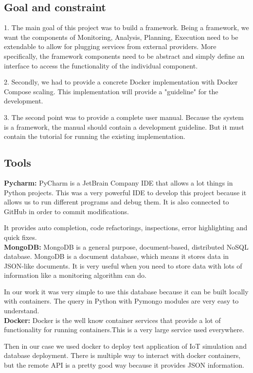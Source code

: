 \documentclass[11pt]{IEEEtran}
\begin{document}
\subsection{Goal and constraint}
1. The main goal of this project was to build a framework. Being a framework, we want the components of Monitoring, Analysis, Planning, Execution need to be extendable to allow for plugging services from external providers. More specifically, the framework components need to be abstract and simply define an interface to access the functionality of the individual component. 

2. Secondly, we had to provide a concrete Docker implementation with Docker Compose scaling. This implementation will provide a "guideline" for the development.

3. The second point was to provide a complete user manual. Because the system is a framework, the manual should contain a development guideline. But it must contain the tutorial for running the existing implementation.

\subsection{Tools}
\textbf{Pycharm:} 
PyCharm is a JetBrain Company IDE that allows a lot things in Python projects. This was a very powerful IDE  to develop this project because it allows us to run different programs and debug them. It is also connected to GitHub in order to commit modifications.

It provides auto completion, code refactorings, inspections, error highlighting and quick fixes. \\

\textbf{MongoDB:}
MongoDB is a general purpose, document-based, distributed NoSQL database. MongoDB is a document database, which means it stores data in JSON-like documents. It is very useful when you need to store data with lots of information like a monitoring algorithm can do.

In our work it was very simple to use this database because it can be built locally with containers. The query in Python with Pymongo modules are very easy to understand. \\


\textbf{Docker:}
Docker is the well know container services that provide a lot of functionality for running containers.This is a very large service used everywhere. 

Then in our case we used docker to deploy test application of IoT simulation and database deployment. There is multiple way to interact with docker containers, but the remote API is a pretty good way because it provides JSON information.
\end{document}
